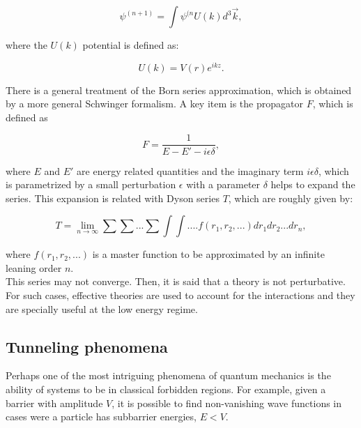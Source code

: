 \documentclass[openany]{book}
\begin{document}
\begin{equation} \label{eq:bornApproximation_iteration}
	\psi^{(n+1)}  = \int  \psi^{(n} U(k) d^3\vec k,
\end{equation}

where the $U(k)$ potential is defined as:

\begin{equation} \label{eq:bornApproximation_U_potential}
	U(k)  = V(r) e^{ikz}.
\end{equation}

There is a general treatment of the Born series approximation, which is obtained by a more general Schwinger formalism. A key item is the propagator $F$, which is defined as 

\begin{equation}\label{eq:bornApproximation_propagator}
	F = \frac{1}{E - E' - i \epsilon \delta},
\end{equation}

where $E$ and $E'$ are energy related quantities and the imaginary term  $i \epsilon \delta$, which is parametrized by a small perturbation $\epsilon$ with a parameter $\delta$ helps to expand the series. This expansion is related with Dyson series $T$, which are roughly given by:

 \begin{equation}\label{eq:bornApproximation_DysonSeries}
 	T = \lim_{n\rightarrow\infty} \sum \sum ... \sum \int \int .... f(r_1, r_2, ...) dr_1 dr_2 ... dr_n,
 \end{equation}

where $f(r_1, r_2, ...) $ is a master function to be approximated by an infinite leaning order $n$. \\

This series may not converge. Then, it is said that a theory is not perturbative. For such cases, effective theories are used to account for the interactions and they are specially useful at the low energy regime. 


\subsection{Tunneling phenomena} \label{sub:tunnelingPhenomena}

Perhaps one of the most intriguing phenomena of quantum mechanics is the ability of systems to be in classical forbidden regions. For example, given a barrier with amplitude $V$, it is possible to find non-vanishing wave functions in cases were a particle has subbarrier energies, $E < V$. \\
\end{document}
